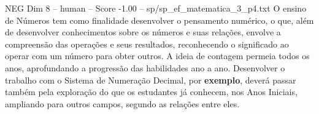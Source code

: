 \begin{textsample}{NEG Dim 8 – human – Score -1.00 – sp/sp\_ef\_matematica\_3\_p4.txt}  \label{ex:f8_neg_019}
O ensino de Números tem como finalidade desenvolver o pensamento numérico, o que, além de desenvolver conhecimentos sobre os números e suas relações, envolve a compreensão das operações e seus resultados, reconhecendo o significado ao operar com um número para obter outros.
A ideia de contagem permeia todos os anos, aprofundando a progressão das habilidades ano a ano.
Desenvolver o trabalho com o Sistema de Numeração Decimal, por \textbf{exemplo}, deverá passar também pela exploração do que os estudantes já conhecem, nos Anos Iniciais, ampliando para outros campos, segundo as relações entre eles.

\end{textsample}
